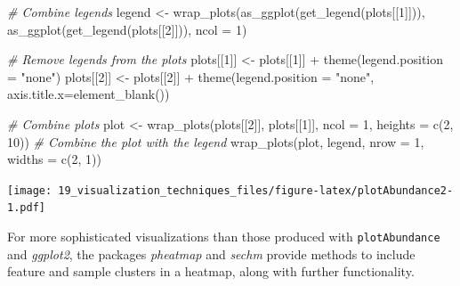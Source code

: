 \documentclass[
]{book}
\newenvironment{Shaded}{\begin{snugshade}}{\end{snugshade}}
\newcommand{\AttributeTok}[1]{\textcolor[rgb]{0.77,0.63,0.00}{#1}}
\newcommand{\CommentTok}[1]{\textcolor[rgb]{0.56,0.35,0.01}{\textit{#1}}}
\newcommand{\DecValTok}[1]{\textcolor[rgb]{0.00,0.00,0.81}{#1}}
\newcommand{\FunctionTok}[1]{\textcolor[rgb]{0.00,0.00,0.00}{#1}}
\newcommand{\NormalTok}[1]{#1}
\newcommand{\OtherTok}[1]{\textcolor[rgb]{0.56,0.35,0.01}{#1}}
\newcommand{\SpecialCharTok}[1]{\textcolor[rgb]{0.00,0.00,0.00}{#1}}
\newcommand{\StringTok}[1]{\textcolor[rgb]{0.31,0.60,0.02}{#1}}
\begin{document}
\begin{Shaded}
\begin{Highlighting}[]
\CommentTok{\# Combine legends}
\NormalTok{legend }\OtherTok{\textless{}{-}} \FunctionTok{wrap\_plots}\NormalTok{(}\FunctionTok{as\_ggplot}\NormalTok{(}\FunctionTok{get\_legend}\NormalTok{(plots[[}\DecValTok{1}\NormalTok{]])), }\FunctionTok{as\_ggplot}\NormalTok{(}\FunctionTok{get\_legend}\NormalTok{(plots[[}\DecValTok{2}\NormalTok{]])), }\AttributeTok{ncol =} \DecValTok{1}\NormalTok{) }

\CommentTok{\# Remove legends from the plots}
\NormalTok{plots[[}\DecValTok{1}\NormalTok{]] }\OtherTok{\textless{}{-}}\NormalTok{ plots[[}\DecValTok{1}\NormalTok{]] }\SpecialCharTok{+} \FunctionTok{theme}\NormalTok{(}\AttributeTok{legend.position =} \StringTok{"none"}\NormalTok{)}
\NormalTok{plots[[}\DecValTok{2}\NormalTok{]] }\OtherTok{\textless{}{-}}\NormalTok{ plots[[}\DecValTok{2}\NormalTok{]] }\SpecialCharTok{+} \FunctionTok{theme}\NormalTok{(}\AttributeTok{legend.position =} \StringTok{"none"}\NormalTok{, }\AttributeTok{axis.title.x=}\FunctionTok{element\_blank}\NormalTok{()) }

\CommentTok{\# Combine plots}
\NormalTok{plot }\OtherTok{\textless{}{-}} \FunctionTok{wrap\_plots}\NormalTok{(plots[[}\DecValTok{2}\NormalTok{]], plots[[}\DecValTok{1}\NormalTok{]], }\AttributeTok{ncol =} \DecValTok{1}\NormalTok{, }\AttributeTok{heights =} \FunctionTok{c}\NormalTok{(}\DecValTok{2}\NormalTok{, }\DecValTok{10}\NormalTok{))}
\CommentTok{\# Combine the plot with the legend}
\FunctionTok{wrap\_plots}\NormalTok{(plot, legend, }\AttributeTok{nrow =} \DecValTok{1}\NormalTok{, }\AttributeTok{widths =} \FunctionTok{c}\NormalTok{(}\DecValTok{2}\NormalTok{, }\DecValTok{1}\NormalTok{))}
\end{Highlighting}
\end{Shaded}

\texttt{[image: 19\_visualization\_techniques\_files/figure-latex/plotAbundance2-1.pdf]}

For more sophisticated visualizations than those produced with \texttt{plotAbundance}
and \emph{ggplot2}, the packages \emph{pheatmap} and \emph{sechm} provide methods to include
feature and sample clusters in a heatmap, along with further functionality.
\end{document}
